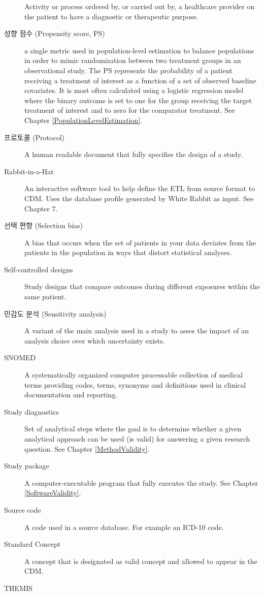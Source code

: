 \documentclass[11pt]{book}
\theoremstyle{definition}
\theoremstyle{definition}
\theoremstyle{definition}
\theoremstyle{remark}
\begin{document}
\begin{description}
Activity or process ordered by, or carried out by, a healthcare provider
on the patient to have a diagnostic or therapeutic purpose.
\item[성향 점수 (Propensity score, PS)]
a single metric used in population-level estimation to balance
populations in order to mimic randomization between two treatment groups
in an observational study. The PS represents the probability of a
patient receiving a treatment of interest as a function of a set of
observed baseline covariates. It is most often calculated using a
logistic regression model where the binary outcome is set to one for the
group receiving the target treatment of interest and to zero for the
comparator treatment. See Chapter \ref{PopulationLevelEstimation}.
\item[프로토콜 (Protocol)]
A human readable document that fully specifies the design of a study.
\item[Rabbit-in-a-Hat]
An interactive software tool to help define the ETL from source format
to CDM. Uses the database profile generated by White Rabbit as input.
See Chapter 7.
\item[선택 편향 (Selection bias)]
A bias that occurs when the set of patients in your data deviates from
the patients in the population in ways that distort statistical
analyses.
\item[Self-controlled designs]
Study designs that compare outcomes during different exposures within
the same patient.
\item[민감도 분석 (Sensitivity analysis)]
A variant of the main analysis used in a study to asses the impact of an
analysis choice over which uncertainty exists.
\item[SNOMED]
A systematically organized computer processable collection of medical
terms providing codes, terms, synonyms and definitions used in clinical
documentation and reporting.
\item[Study diagnostics]
Set of analytical steps where the goal is to determine whether a given
analytical approach can be used (is valid) for answering a given
research question. See Chapter \ref{MethodValidity}.
\item[Study package]
A computer-executable program that fully executes the study. See Chapter
\ref{SoftwareValidity}.
\item[Source code]
A code used in a source database. For example an ICD-10 code.
\item[Standard Concept]
A concept that is designated as valid concept and allowed to appear in
the CDM.
\item[THEMIS]

\end{description}
\end{document}
